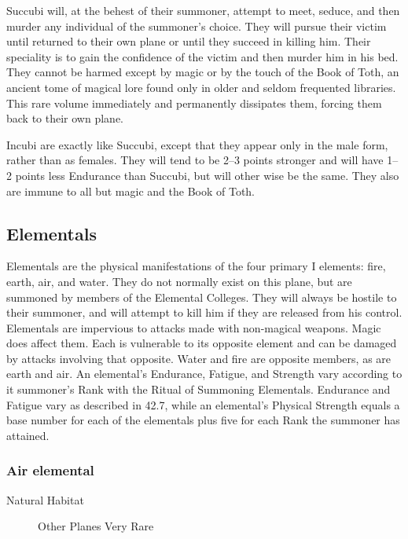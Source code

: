\begin{multicols}{2}
\begin{description}
\setlength\itemsep{0pt}

\item[Comments]Succubi will, at the behest of their summoner, attempt to meet,
seduce, and then murder any individual of the summoner's choice.  They
will pursue their victim until returned to their own plane or until
they succeed in killing him. Their speciality is to gain the
confidence of the victim and then murder him in his bed.  They cannot
be harmed except by magic or by the touch of the Book of Toth, an
ancient tome of magical lore found only in older and seldom frequented
libraries.  This rare volume immediately and permanently dissipates
them, forcing them back to their own plane.

Incubi are exactly like Succubi, except that they appear only in the
male form, rather than as females.  They will tend to be 2--3 points
stronger and will have 1--2 points less Endurance than Succubi, but
will other wise be the same.  They also are immune to all but magic
and the Book of Toth.

\end{description}

\subsection{Elementals}
Elementals are the physical manifestations of the four primary I
elements: fire, earth, air, and water. They do not normally exist on
this plane, but are summoned by members of the Elemental
Colleges. They will always be hostile to their summoner, and will
attempt to kill him if they are released from his control.  Elementals
are impervious to attacks made with non-magical weapons. Magic does
affect them. Each is vulnerable to its opposite element and can be
damaged by attacks involving that opposite. Water and fire are
opposite members, as are earth and air.  An elemental's Endurance,
Fatigue, and Strength vary according to it summoner's Rank with the
Ritual of Summoning Elementals. Endurance and Fatigue vary as
described in 42.7, while an elemental's Physical Strength equals a
base number for each of the elementals plus five for each Rank the
summoner has attained.

\subsubsection{Air elemental}

\begin{description}
\item[Natural Habitat] Other Planes Very Rare


\end{description}
\end{multicols}
